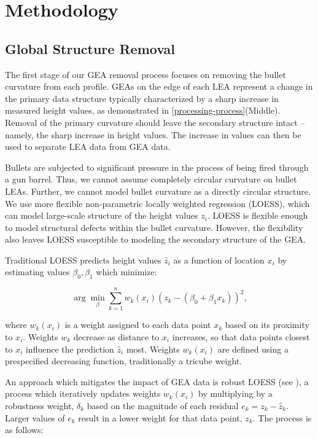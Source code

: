 \documentclass[12pt]{article}
\begin{document}
\section{Methodology}

\subsection{Global Structure Removal}

The first stage of our GEA removal process focuses on removing the
bullet curvature from each profile. GEAs on the edge of each LEA
represent a change in the primary data structure typically characterized
by a sharp increase in measured height values, as demonstrated in
\autoref{processing-process}(Middle). Removal of the primary curvature
should leave the secondary structure intact -- namely, the sharp
increase in height values. The increase in values can then be used to
separate LEA data from GEA data.

Bullets are subjected to significant pressure in the process of being
fired through a gun barrel. Thus, we cannot assume completely circular
curvature on bullet LEAs. Further, we cannot model bullet curvature as a
directly circular structure. We use more flexible non-parametric locally
weighted regression (LOESS), which can model large-scale structure of
the height values \(z_i\). LOESS is flexible enough to model structural
defects within the bullet curvature. However, the flexibility also
leaves LOESS susceptible to modeling the secondary structure of the GEA.

Traditional LOESS predicts height values \(\widehat{z}_i\) as a function
of location \(x_i\) by estimating values \(\beta_0, \beta_1\) which
minimize:

\[ \arg\min_{\beta} \sum_{k=1}^n w_k(x_i) (z_k - (\beta_0 + \beta_1x_k))^2,\]

where \(w_k(x_i)\) is a weight assigned to each data point \(x_k\) based
on its proximity to \(x_i\). Weights \(w_k\) decrease as distance to
\(x_i\) increases, so that data points closest to \(x_i\) influence the
prediction \(\widehat{z}_i\) most. Weights \(w_k(x_i)\) are defined
using a prespecified decreasing function, traditionally a tricube
weight.

An approach which mitigates the impact of GEA data is robust LOESS (see
\cite{Cleveland1}), a process which iteratively updates weights
\(w_k(x_i)\) by multiplying by a robustness weight, \(\delta_k\) based
on the magnitude of each residual \(e_k = z_k - \widehat{z}_k\). Larger
values of \(e_k\) result in a lower weight for that data point, \(z_k\).
The process is as follows:
\end{document}
